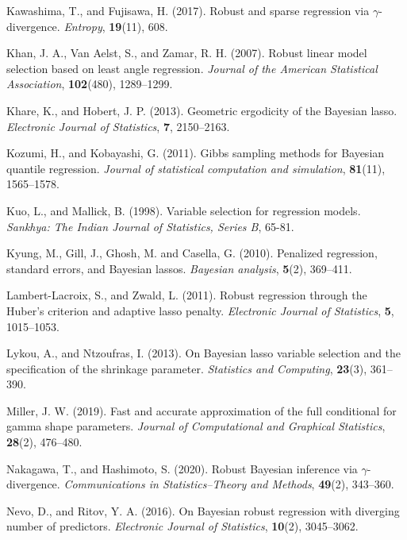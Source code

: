 \documentclass[11pt]{article}
\theoremstyle{plain}
\theoremstyle{definition}
\begin{document}
\begin{thebibliography}{99}
 Kawashima, T., and Fujisawa, H. (2017). Robust and sparse regression via $\gamma$-divergence. {\it Entropy}, {\bf 19}(11), 608.

 Khan, J. A., Van Aelst, S., and Zamar, R. H. (2007). Robust linear model selection based on least angle regression. {\it Journal of the American Statistical Association}, {\bf 102}(480), 1289--1299.

 Khare, K., and Hobert, J. P. (2013). Geometric ergodicity of the Bayesian lasso. {\it Electronic Journal of Statistics}, {\bf 7}, 2150--2163.

 Kozumi, H., and Kobayashi, G. (2011). Gibbs sampling methods for Bayesian quantile regression. {\it Journal of statistical computation and simulation}, {\bf 81}(11), 1565--1578.

 Kuo, L., and Mallick, B. (1998). Variable selection for regression models. {\it Sankhy\-a: The Indian Journal of Statistics, Series B}, 65-81.

 Kyung, M., Gill, J., Ghosh, M. and Casella, G. (2010). Penalized regression, standard errors, and Bayesian lassos. {\it Bayesian analysis}, {\bf 5}(2), 369--411.

 Lambert-Lacroix, S., and Zwald, L. (2011). Robust regression through the Huber's criterion and adaptive lasso penalty. {\it Electronic Journal of Statistics}, {\bf 5}, 1015--1053.

 Lykou, A., and  Ntzoufras, I. (2013). On Bayesian lasso variable selection and the specification of the shrinkage parameter. {\it Statistics and Computing}, {\bf 23}(3), 361--390.

 Miller, J. W. (2019). Fast and accurate approximation of the full conditional for gamma shape parameters. {\it Journal of Computational and Graphical Statistics}, {\bf 28}(2), 476--480.

 Nakagawa, T., and Hashimoto, S. (2020). Robust Bayesian inference via $\gamma$-divergence. {\it Communications in Statistics--Theory and Methods}, {\bf 49}(2), 343--360.

 Nevo, D., and Ritov, Y. A. (2016). On Bayesian robust regression with diverging number of predictors. {\it Electronic Journal of Statistics}, {\bf 10}(2), 3045--3062.


\end{thebibliography}
\end{document}
